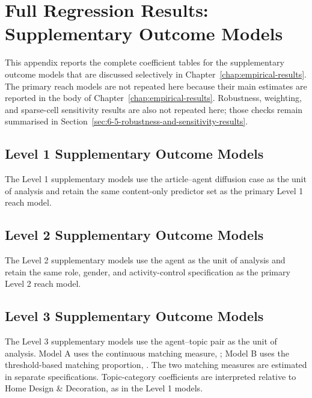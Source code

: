 \chapter{Full Regression Results: Supplementary Outcome Models}
\label{app:supplementary-regression-results}

This appendix reports the complete coefficient tables for the supplementary outcome models that are discussed selectively in Chapter~\ref{chap:empirical-results}. The primary reach models are not repeated here because their main estimates are reported in the body of Chapter~\ref{chap:empirical-results}. Robustness, weighting, and sparse-cell sensitivity results are also not repeated here; those checks remain summarised in Section~\ref{sec:6-5-robustness-and-sensitivity-results}.

\section{Level 1 Supplementary Outcome Models}
\label{app:c-level-1}

The Level 1 supplementary models use the article--agent diffusion case as the unit of analysis and retain the same content-only predictor set as the primary Level 1 reach model.





\section{Level 2 Supplementary Outcome Models}
\label{app:c-level-2}

The Level 2 supplementary models use the agent as the unit of analysis and retain the same role, gender, and activity-control specification as the primary Level 2 reach model.





\section{Level 3 Supplementary Outcome Models}
\label{app:c-level-3}

The Level 3 supplementary models use the agent--topic pair as the unit of analysis. Model A uses the continuous matching measure, ; Model B uses the threshold-based matching proportion, . The two matching measures are estimated in separate specifications. Topic-category coefficients are interpreted relative to Home Design \& Decoration, as in the Level 1 models.








